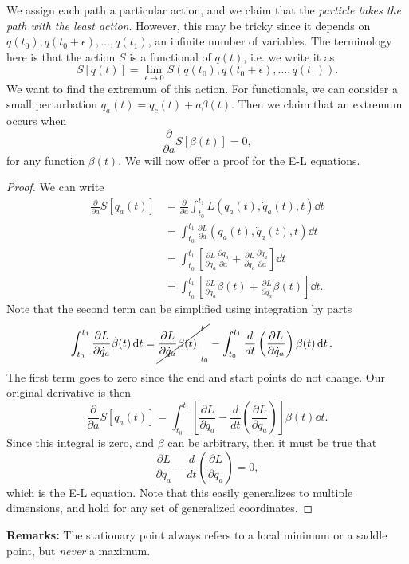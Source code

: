 \documentclass{article}
\numberwithin{equation}{section}
\begin{document}
We assign each path a particular action, and we claim that the \textit{particle takes the path with the least action}. However, this may be tricky since it depends on $q(t_0),q(t_0+\epsilon),\dots,q(t_1)$, an infinite number of variables. The terminology here is that the action $S$ is a functional of $q(t)$, i.e. we write it as
\begin{equation}
    S[q(t)] = \lim_{\epsilon \to 0} S(q(t_0), q(t_0+\epsilon), \dots, q(t_1)).
\end{equation}
We want to find the extremum of this action. For functionals, we can consider a small perturbation $q_a(t)=q_c(t) + a \beta(t)$. Then we claim that an extremum occurs when
\begin{equation}
    \frac{\partial}{\partial a}S[\beta(t)] = 0,
\end{equation}
for any function $\beta(t).$ We will now offer a proof for the E-L equations.
\begin{proof}
    We can write 
    \begin{align*}
        \frac{\partial}{\partial a} S[q_a(t)] &= \frac{\partial}{\partial a}\int_{t_0}^{t_1} L(q_a(t), \dot{q}_a(t), t) \dd{t} \\
        &= \int_{t_0}^{t_1} \frac{\partial L}{\partial a}(q_a(t), \dot{q}_a(t), t) \dd{t} \\
        &= \int_{t_0}^{t_1} \left[\frac{\partial L}{\partial q_a}\frac{\partial q_a}{\partial a} + \frac{\partial L}{\partial \dot{q}_a}\frac{\partial \dot{q}_a}{\partial a}\right]\dd{t} \\
        &= \int_{t_0}^{t_1} \left[\frac{\partial L}{\partial q_a}\beta(t) + \frac{\partial L}{\partial \dot{q}_a}\dot{\beta}(t)\right] \dd{t}.
    \end{align*}
    Note that the second term can be simplified using integration by parts 
    \begin{align*}
        \int_{t_0}^{t_1}\frac{\partial L}{\partial \dot{q}_a}\dot{\beta}(t)\dd{t} &= \cancel{\frac{\partial L}{\partial \dot{q}_a}\beta(t)\Bigg|^{t_1}_{t_0}} - \int_{t_0}^{t_1}\frac{d}{dt}\left(\frac{\partial L}{\partial \dot{q}_a}\right)\beta(t) \dd{t}.
    \end{align*}
    The first term goes to zero since the end and start points do not change. Our original derivative is then
    \begin{equation}
        \frac{\partial}{\partial a}S[q_a(t)] = \int_{t_0}^{t_1}\left[\frac{\partial L}{\partial q_a} - \frac{d}{dt}\left(\frac{\partial L}{\partial \dot{q}_a}\right)\right]\beta(t) \dd{t}.
    \end{equation}
    Since this integral is zero, and $\beta$ can be arbitrary, then it must be true that
    \begin{equation}
        \frac{\partial L}{\partial q_a} - \frac{d}{dt}\left(\frac{\partial L}{\partial \dot{q}_a}\right) = 0,
    \end{equation}
    which is the E-L equation. Note that this easily generalizes to multiple dimensions, and hold for any set of generalized coordinates.
\end{proof}
\textbf{Remarks:} The stationary point always refers to a local minimum or a saddle point, but \textit{never} a maximum.
\end{document}
